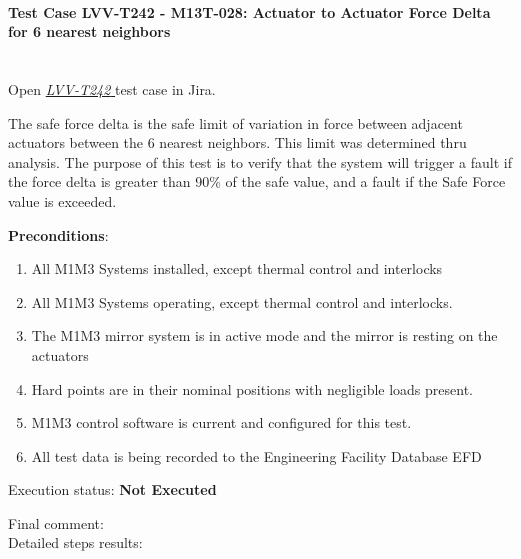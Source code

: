 \documentclass[SE,lsstdraft,STR,toc]{lsstdoc}
\providecommand{\tightlist}{
  \setlength{\itemsep}{0pt}\setlength{\parskip}{0pt}}
\begin{document}
\paragraph{Test Case LVV-T242 - M13T-028: Actuator to Actuator Force Delta for 6 nearest neighbors }\mbox{}\\

Open  \href{https://jira.lsstcorp.org/secure/Tests.jspa#/testCase/LVV-T242}{\textit{ LVV-T242 } }
test case in Jira.

The safe force delta is the safe limit of variation in force between
adjacent actuators between the 6 nearest neighbors. This limit was
determined thru analysis. The purpose of this test is to verify that the
system will trigger a fault if the force delta is greater than 90\% of
the safe value, and a fault if the Safe Force value is exceeded.

\textbf{ Preconditions}:\\
\begin{enumerate}
\tightlist
\item
  All M1M3 Systems installed, except thermal control and interlocks
\item
  All M1M3 Systems operating, except thermal control and interlocks.
\item
  The M1M3 mirror system is in active mode and the mirror is resting on
  the actuators
\item
  Hard points are in their nominal positions with negligible loads
  present.
\item
  M1M3 control software is current and configured for this test.
\item
  All test data is being recorded to the Engineering Facility Database
  EFD
\end{enumerate}

Execution status: {\bf Not Executed }

Final comment:\\


Detailed steps results:
\end{document}
